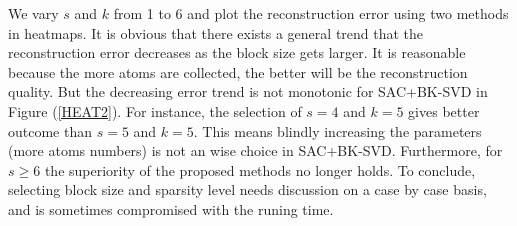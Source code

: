 We vary $s$ and $k$ from 1 to 6 and plot the reconstruction error using two methods in heatmaps. It is obvious that there exists a general trend that the reconstruction error decreases as the block size gets larger. It is reasonable because the more atoms are collected, the better will be the reconstruction quality. But the decreasing error trend is not monotonic for SAC+BK-SVD in Figure (\ref{HEAT2}). For instance, the selection of $s=4$ and $k=5$ gives better outcome than $s=5$ and $k=5$. This means blindly increasing the parameters (more atoms numbers) is not an wise choice in SAC+BK-SVD. Furthermore, for $s\geq 6$ the superiority of the proposed methods no longer holds. To conclude, selecting block size and sparsity level needs discussion on a case by case basis, and is sometimes compromised with the runing time.
